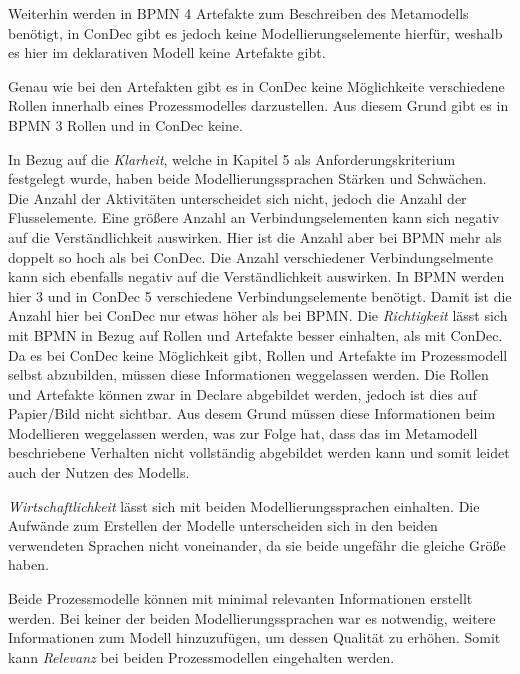 Weiterhin werden in BPMN 4 Artefakte zum Beschreiben des Metamodells benötigt, in ConDec gibt es jedoch keine Modellierungselemente hierfür, weshalb es hier im deklarativen Modell keine Artefakte gibt.\newline


Genau wie bei den Artefakten gibt es in ConDec keine Möglichkeite verschiedene Rollen innerhalb eines Prozessmodelles darzustellen. Aus diesem Grund gibt es in BPMN 3 Rollen und in ConDec keine.\newline


In Bezug auf die \textit{Klarheit}, welche in Kapitel 5 als Anforderungskriterium festgelegt wurde, haben beide Modellierungssprachen Stärken und Schwächen. Die Anzahl der Aktivitäten unterscheidet sich nicht, jedoch die Anzahl der Flusselemente. Eine größere Anzahl an Verbindungselementen kann sich negativ auf die Verständlichkeit auswirken. Hier ist die Anzahl aber bei BPMN mehr als doppelt so hoch als bei ConDec. Die Anzahl verschiedener Verbindungselmente kann sich ebenfalls negativ auf die Verständlichkeit auswirken. In BPMN werden hier 3 und in ConDec 5 verschiedene Verbindungselemente benötigt. Damit ist die Anzahl hier bei ConDec nur etwas höher als bei BPMN.
\newline
Die \textit{Richtigkeit} lässt sich mit BPMN in Bezug auf Rollen und Artefakte besser einhalten, als mit ConDec. Da es bei ConDec keine Möglichkeit gibt, Rollen und Artefakte im Prozessmodell selbst abzubilden, müssen diese Informationen weggelassen werden. Die Rollen und Artefakte können zwar in Declare abgebildet werden, jedoch ist dies auf Papier/Bild nicht sichtbar. Aus desem Grund müssen diese Informationen beim Modellieren weggelassen werden, was zur Folge hat, dass das im Metamodell beschriebene Verhalten nicht vollständig abgebildet werden kann und somit leidet auch der Nutzen des Modells.\newline

\textit{Wirtschaftlichkeit} lässt sich mit beiden Modellierungssprachen einhalten. Die Aufwände zum Erstellen der Modelle unterscheiden sich in den beiden verwendeten Sprachen nicht voneinander, da sie beide ungefähr die gleiche Größe haben.\newline

Beide Prozessmodelle können mit minimal relevanten Informationen erstellt werden. Bei keiner der beiden Modellierungssprachen war es notwendig, weitere Informationen zum Modell hinzuzufügen, um dessen Qualität zu erhöhen. Somit kann \textit{Relevanz} bei beiden Prozessmodellen eingehalten werden.\newline

